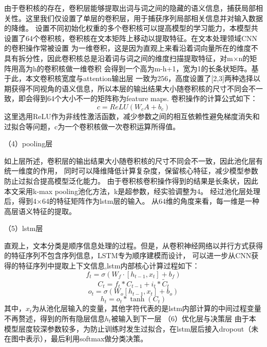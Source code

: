   由于卷积核的存在，卷积层能够提取出词与词之间的隐藏的语义信息，捕获局部相关性。这里我们仅设置了单层的卷积层，用于捕获序列局部相关信息并对输入数据的降维。
  设置不同初始化权重的多个卷积核可以提高模型的学习能力，本模型共设置了64个卷积核，卷积核在文本矩阵上移动以提取特征。在文本处理领域CNN的卷积操作常被设置
  为一维卷积，这是因为直观上来看沿着词向量所在的维度不具有拆分性，因此卷积核总是沿着词与词之间的维度扫描提取特征，对m×n的矩阵用高为h的卷积核做一维卷积
  会得到一个高为m-h+1，宽为1的长条状矩阵。基于此，本文卷积核宽度与attention输出层
  一致为256，高度设置了[2,3]两种选择以期获得不同视角的语义信息，所以本层的输出结果大小随卷积核的尺寸不同会不一致，即会得到64个大小不一的矩阵称为feature maps.
  卷积操作的计算公式如下：
  \begin{equation}
    c=ReLU(W_{c}A+b_{c})
    \end{equation}
    这里选用ReLU作为非线性激活函数，减少参数之间的相互依赖性避免梯度消失和过拟合等问题，c为一个卷积核做一次卷积运算所得值。

   （4）pooling层

    如上层所述，卷积层的输出结果大小随卷积核的尺寸不同会不一致，因此池化层有统一维度的作用，
    同时可以降维降低计算复杂度，保留核心特征，减少模型参数防止过拟合提高模型泛化能力。
    由于卷积核卷积操作得到的结果是长条状，因此本文采用k-max pooling池化方法，k是超参数，经实验调整为4。
    经过池化层处理后，得到4×64的特征矩阵作为lstm层的输入。
    从64维的角度来看，每一维是一种高层语义特征的提取。

    （5）lstm层

  直观上，文本分类是顺序信息处理的过程。但是，从卷积神经网络以并行方式获得的特征序列不包含序列信息，LSTM专为顺序建模而设计，
  可以进一步从CNN获得的特征序列中提取上下文信息,lstm内部核心计算过程如下：
  \begin{equation}
  f_{t}=σ(W_{f}\cdot[h_{t-1},x_t]+b_{f})
  \end{equation}
  \begin{equation}
    C_{t}=f_{t} * C_{t-1}+i_{t} * \tilde{C}_{t}
    \end{equation} 
    \begin{equation}
      o_{t}=\sigma\left(W_{o}\left[h_{t-1}, x_{t}\right]+b_{o}\right)
    \end{equation} 
    \begin{equation}
      h_{t}=o_{t} * \tanh \left(C_{t}\right)
    \end{equation}
    其中，$x_t$为从池化层输入的变量，其他字符代表的是lstm内部计算的中间过程变量不再赘述，得到的所有隐层信息$h_t$被输入到下一层
  （6）优化层与决策层
    由于本模型层度较深参数较多，为防止训练时发生过拟合，在lstm层后接入dropout（未在图中表示），最后利用softmax做分类决策。


